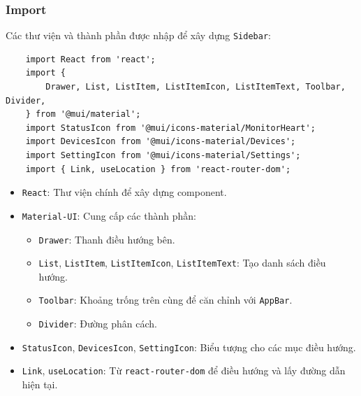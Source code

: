             \subsubsection{Import}
                \hspace*{0.6cm}Các thư viện và thành phần được nhập để xây dựng \texttt{Sidebar}:
                \begin{lstlisting}
    import React from 'react';
    import {
        Drawer, List, ListItem, ListItemIcon, ListItemText, Toolbar, Divider,
    } from '@mui/material';
    import StatusIcon from '@mui/icons-material/MonitorHeart';
    import DevicesIcon from '@mui/icons-material/Devices';
    import SettingIcon from '@mui/icons-material/Settings';
    import { Link, useLocation } from 'react-router-dom';
                \end{lstlisting}
                \begin{itemize}
                    \item \texttt{React}: Thư viện chính để xây dựng component.
                    \item \texttt{Material-UI}: Cung cấp các thành phần:
                    \begin{itemize}
                        \item \texttt{Drawer}: Thanh điều hướng bên.
                        \item \texttt{List}, \texttt{ListItem}, \texttt{ListItemIcon}, \texttt{ListItemText}: Tạo danh sách điều hướng.
                        \item \texttt{Toolbar}: Khoảng trống trên cùng để căn chỉnh với \texttt{AppBar}.
                        \item \texttt{Divider}: Đường phân cách.
                    \end{itemize}
                    \item \texttt{StatusIcon}, \texttt{DevicesIcon}, \texttt{SettingIcon}: Biểu tượng cho các mục điều hướng.
                    \item \texttt{Link}, \texttt{useLocation}: Từ \texttt{react-router-dom} để điều hướng và lấy đường dẫn hiện tại.
                \end{itemize}

